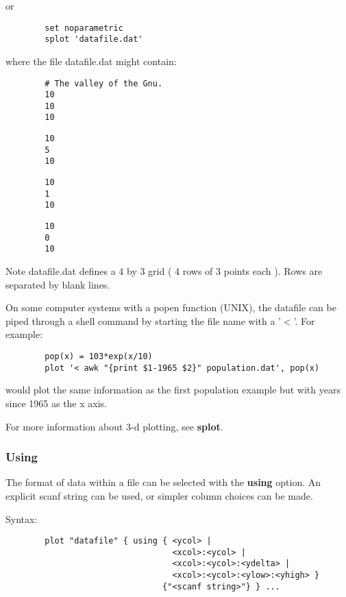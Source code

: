 or

\begin{verbatim}
        set noparametric
        splot 'datafile.dat'
\end{verbatim}

where the file datafile.dat might contain:

\begin{verbatim}
        # The valley of the Gnu.
        10
        10
        10
\end{verbatim}

\begin{verbatim}
        10
        5
        10
\end{verbatim}

\begin{verbatim}
        10
        1
        10
\end{verbatim}

\begin{verbatim}
        10
        0
        10
\end{verbatim}

Note datafile.dat defines a 4 by 3 grid ( 4 rows of 3 points each ).
Rows are separated by blank lines.

On some computer systems with a popen function (UNIX), the datafile
can be piped through a shell command by starting the file name
with a '$<$'.  For example:

\begin{verbatim}
        pop(x) = 103*exp(x/10)
        plot '< awk "{print $1-1965 $2}" population.dat', pop(x)
\end{verbatim}

would plot the same information as the first population example
but with years since 1965 as the x axis.

For more information about 3-d plotting, see {\bf splot}.
\subsubsection{Using}
The format of data within a file can be selected with the {\bf using} 
option. An explicit scanf string can be used, or simpler column
choices can be made.

Syntax:

\begin{verbatim}
        plot "datafile" { using { <ycol> |
                                  <xcol>:<ycol> |
                                  <xcol>:<ycol>:<ydelta> |
                                  <xcol>:<ycol>:<ylow>:<yhigh> }
                                {"<scanf string>"} } ...
\end{verbatim}

